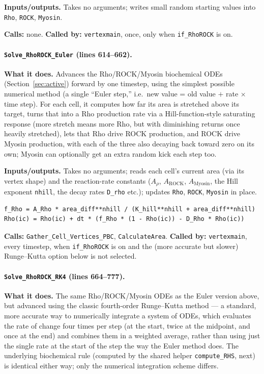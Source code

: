 \documentclass[11pt]{article}
\begin{document}
\textbf{Inputs/outputs.} Takes no arguments; writes small random starting values into
\texttt{Rho}, \texttt{ROCK}, \texttt{Myosin}.

\textbf{Calls:} none. \textbf{Called by:} \texttt{vertexmain}, once, only when
\texttt{if\_RhoROCK} is on.

\paragraph{\texttt{Solve\_RhoROCK\_Euler} (lines 614--662).}
\textbf{What it does.} Advances the Rho/ROCK/Myosin biochemical ODEs
(Section~\ref{sec:active}) forward by one timestep, using the simplest possible
numerical method (a single ``Euler step,'' i.e.\ new value = old value $+$ rate $\times$
time step). For each cell, it computes how far its area is stretched above its target,
turns that into a Rho production rate via a Hill-function-style saturating response
(more stretch means more Rho, but with diminishing returns once heavily stretched), lets
that Rho drive ROCK production, and ROCK drive Myosin production, with each of the three
also decaying back toward zero on its own; Myosin can optionally get an extra random
kick each step too.

\textbf{Inputs/outputs.} Takes no arguments; reads each cell's current area (via its
vertex shape) and the reaction-rate constants ($A_\rho$, $A_{\text{ROCK}}$,
$A_{\text{Myosin}}$, the Hill exponent \texttt{nhill}, the decay rates \texttt{D\_rho}
etc.); updates \texttt{Rho}, \texttt{ROCK}, \texttt{Myosin} in place.

\begin{lstlisting}[caption={One cell's Hill-function Rho production and the Euler update, in \texttt{Solve\_RhoROCK\_Euler}.}]
f_Rho = A_Rho * area_diff**nhill / (K_hill**nhill + area_diff**nhill)
Rho(ic) = Rho(ic) + dt * (f_Rho * (1 - Rho(ic)) - D_Rho * Rho(ic))
\end{lstlisting}

\textbf{Calls:} \texttt{Gather\_Cell\_Vertices\_PBC}, \texttt{CalculateArea}.
\textbf{Called by:} \texttt{vertexmain}, every timestep, when \texttt{if\_RhoROCK} is on
and the (more accurate but slower) Runge--Kutta option below is not selected.

\paragraph{\texttt{Solve\_RhoROCK\_RK4} (lines 664--777).}
\textbf{What it does.} The same Rho/ROCK/Myosin ODEs as the Euler version above, but
advanced using the classic fourth-order Runge--Kutta method --- a standard, more
accurate way to numerically integrate a system of ODEs, which evaluates the rate of
change four times per step (at the start, twice at the midpoint, and once at the end)
and combines them in a weighted average, rather than using just the single rate at the
start of the step the way the Euler method does. The underlying biochemical rule
(computed by the shared helper \texttt{compute\_RHS}, next) is identical either way;
only the numerical integration scheme differs.
\end{document}
